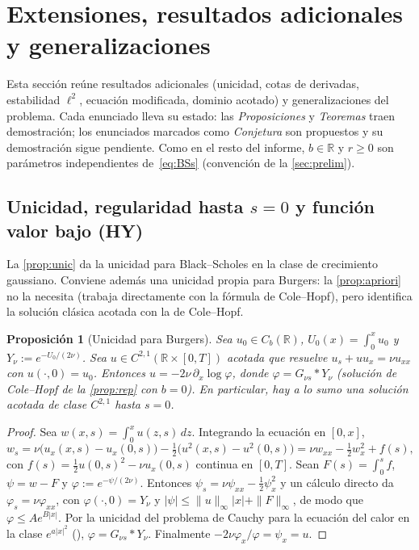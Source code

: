 \documentclass[11pt,letterpaper]{article}
\theoremstyle{plain}
\newtheorem{proposicion}[theorem]{Proposición}
\theoremstyle{definition}
\theoremstyle{remark}
\numberwithin{equation}{section}
\newcommand{\R}{\mathbb{R}}
\begin{document}
	\section{Extensiones, resultados adicionales y generalizaciones}\label{sec:ext}
	
	Esta sección reúne resultados adicionales (unicidad, cotas de derivadas, estabilidad \(\ell^2\), ecuación modificada, dominio acotado) y generalizaciones del problema. Cada enunciado lleva su estado: las \emph{Proposiciones} y \emph{Teoremas} traen demostración; los enunciados marcados como \emph{Conjetura} son propuestos y su demostración sigue pendiente. Como en el resto del informe, \(b\in\R\) y \(r\ge0\) son parámetros independientes de~\eqref{eq:BSs} (convención de la \cref{sec:prelim}).
	
	\subsection{Unicidad, regularidad hasta \texorpdfstring{\(s=0\)}{s=0} y función valor bajo (HY)}\label{subsec:unicidad}
	
	La \cref{prop:unic} da la unicidad para Black--Scholes en la clase de crecimiento gaussiano. Conviene además una unicidad propia para Burgers: la \cref{prop:apriori} no la necesita (trabaja directamente con la fórmula de Cole--Hopf), pero identifica la solución clásica acotada con la de Cole--Hopf.
	
	\begin{proposicion}[Unicidad para Burgers]\label{prop:unicBurgers}
		Sea \(u_0\in C_b(\R)\), \(U_0(x)=\int_0^xu_0\) y \(Y_\nu:=e^{-U_0/(2\nu)}\). Sea \(u\in C^{2,1}(\R\times[0,T])\) acotada que resuelve \(u_s+uu_x=\nu u_{xx}\) con \(u(\cdot,0)=u_0\). Entonces \(u=-2\nu\,\partial_x\log\varphi\), donde \(\varphi=G_{\nu s}*Y_\nu\) (solución de Cole--Hopf de la \cref{prop:rep} con \(b=0\)). En particular, hay a lo sumo una solución acotada de clase \(C^{2,1}\) hasta \(s=0\).
	\end{proposicion}
	
	\begin{proof}
		Sea \(w(x,s)=\int_0^xu(z,s)\,dz\). Integrando la ecuación en \([0,x]\),
		\[
		w_s=\nu\bigl(u_x(x,s)-u_x(0,s)\bigr)-\tfrac12\bigl(u^2(x,s)-u^2(0,s)\bigr)=\nu w_{xx}-\tfrac12w_x^2+f(s),
		\]
		con \(f(s)=\frac12u(0,s)^2-\nu u_x(0,s)\) continua en \([0,T]\). Sean \(F(s)=\int_0^sf\), \(\psi=w-F\) y \(\varphi:=e^{-\psi/(2\nu)}\). Entonces \(\psi_s=\nu\psi_{xx}-\frac12\psi_x^2\) y un cálculo directo da \(\varphi_s=\nu\varphi_{xx}\), con \(\varphi(\cdot,0)=Y_\nu\) y \(|\psi|\le\|u\|_\infty|x|+\|F\|_\infty\), de modo que \(\varphi\le Ae^{B|x|}\). Por la unicidad del problema de Cauchy para la ecuación del calor en la clase \(e^{a|x|^2}\) (\cite[Sec.~2.3]{Evans2010}), \(\varphi=G_{\nu s}*Y_\nu\). Finalmente \(-2\nu\varphi_x/\varphi=\psi_x=u\).
	\end{proof}
	
\end{document}
